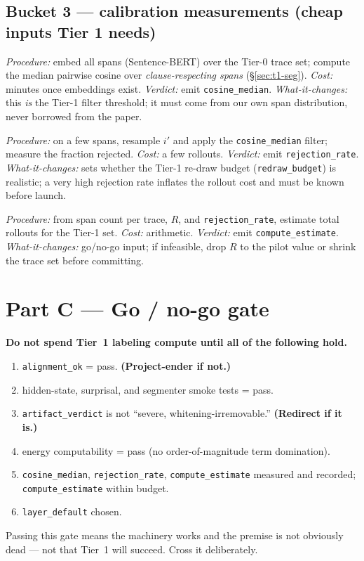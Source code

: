 \documentclass[11pt]{article}
\newcommand{\out}[1]{\texttt{#1}}      %
\newcommand{\param}[1]{\texttt{#1}}    %
\begin{document}
\subsection{Bucket 3 --- calibration measurements (cheap inputs Tier 1 needs)}
\label{sec:t0-calib}
\begin{description}[leftmargin=1.2em,style=nextline]
\item[\out{cosine\_median} --- semantic-filter threshold]
\emph{Procedure:} embed all spans (Sentence-BERT) over the Tier-0 trace set;
compute the median pairwise cosine over \emph{clause-respecting spans}
(\S\ref{sec:t1-seg}). \emph{Cost:} minutes once embeddings exist.
\emph{Verdict:} emit \out{cosine\_median}. \emph{What-it-changes:} this \emph{is}
the Tier-1 filter threshold; it must come from our own span distribution, never
borrowed from the paper.
\item[\out{rejection\_rate} --- re-draw feasibility]
\emph{Procedure:} on a few spans, resample $i'$ and apply the
\out{cosine\_median} filter; measure the fraction rejected. \emph{Cost:} a few
rollouts. \emph{Verdict:} emit \out{rejection\_rate}. \emph{What-it-changes:} sets
whether the Tier-1 re-draw budget (\param{redraw\_budget}) is realistic; a very
high rejection rate inflates the rollout cost and must be known before launch.
\item[\out{compute\_estimate} --- budget]
\emph{Procedure:} from span count per trace, $R$, and \out{rejection\_rate},
estimate total rollouts for the Tier-1 set. \emph{Cost:} arithmetic.
\emph{Verdict:} emit \out{compute\_estimate}. \emph{What-it-changes:} go/no-go
input; if infeasible, drop $R$ to the pilot value or shrink the trace set before
committing.
\end{description}

\section{Part C --- Go / no-go gate}
\label{sec:gate}

\begin{gate}
\textbf{Do not spend Tier~1 labeling compute until all of the following hold.}
\begin{enumerate}[leftmargin=1.6em,itemsep=1pt]
\item \out{alignment\_ok} = pass. \textbf{(Project-ender if not.)}
\item hidden-state, surprisal, and segmenter smoke tests = pass.
\item \out{artifact\_verdict} is not ``severe, whitening-irremovable.''
\textbf{(Redirect if it is.)}
\item energy computability = pass (no order-of-magnitude term domination).
\item \out{cosine\_median}, \out{rejection\_rate}, \out{compute\_estimate}
measured and recorded; \out{compute\_estimate} within budget.
\item \out{layer\_default} chosen.
\end{enumerate}
Passing this gate means the machinery works and the premise is not obviously
dead --- not that Tier~1 will succeed. Cross it deliberately.
\end{gate}
\end{document}
